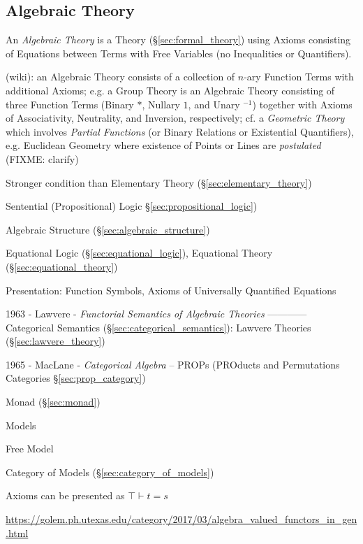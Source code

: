 \subsection{Algebraic Theory}\label{sec:algebraic_theory}

An \emph{Algebraic Theory} is a Theory (\S\ref{sec:formal_theory}) using Axioms
consisting of Equations between Terms with Free Variables (no Inequalities or
Quantifiers).

(wiki): an Algebraic Theory consists of a collection of $n$-ary Function Terms
with additional Axioms; e.g. a Group Theory is an Algebraic Theory consisting of
three Function Terms (Binary $*$, Nullary $1$, and Unary $^{-1}$) together with
Axioms of Associativity, Neutrality, and Inversion, respectively; cf. a
\emph{Geometric Theory} which involves \emph{Partial Functions} (or Binary
Relations or Existential Quantifiers), e.g. Euclidean Geometry where existence
of Points or Lines are \emph{postulated} (FIXME: clarify)

Stronger condition than Elementary Theory (\S\ref{sec:elementary_theory})

Sentential (Propositional) Logic \S\ref{sec:propositional_logic})

Algebraic Structure (\S\ref{sec:algebraic_structure})

Equational Logic (\S\ref{sec:equational_logic}),
Equational Theory (\S\ref{sec:equational_theory})

Presentation: Function Symbols, Axioms of Universally Quantified Equations

1963 - Lawvere - \emph{Functorial Semantics of Algebraic Theories} ------------
Categorical Semantics (\S\ref{sec:categorical_semantics}): Lawvere Theories
(\S\ref{sec:lawvere_theory})

1965 - MacLane - \emph{Categorical Algebra} -- PROPs (PROducts and Permutations
Categories \S\ref{sec:prop_category})

Monad (\S\ref{sec:monad})

Models

Free Model

Category of Models (\S\ref{sec:category_of_models})

Axioms can be presented as $\top \vdash t = s$


\url{https://golem.ph.utexas.edu/category/2017/03/algebra_valued_functors_in_gen.html}




